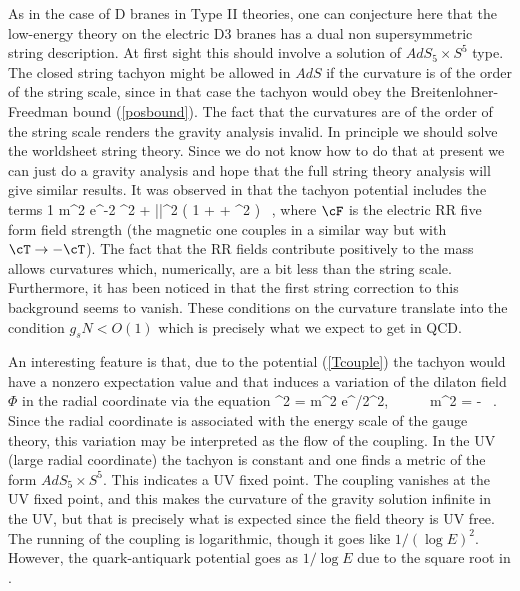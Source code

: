 As in the case of D branes in Type II theories, one
can conjecture here that the low-energy theory on the electric D3 branes 
has a dual non supersymmetric
string description. At first sight this should   involve a
solution of $AdS_5\times S^5$ type. 
The closed string tachyon might be allowed in $AdS$ if the curvature
is of the order of the string scale, since in that case the 
tachyon would obey the  Breitenlohner-Freedman bound (\ref{posbound}).
The fact that the curvatures are of the order of the string scale
renders the gravity analysis invalid. In principle we should
solve the worldsheet string theory. Since we  do not know how to 
do that at present
we can just do a gravity analysis and hope that the full string
theory analysis will give similar results. 
It was observed  in \cite{Klebanov:1998db} that the tachyon 
potential includes the terms
\beq
 {1 } m^2 e^{-2 \Phi} {\cT}^2 + 
|\cF|^2 \left( 1 + \cT  + { {\cT}^2 }  \right) \ ,
\label{Tcouple}
\eeq
where $\cF$ is the electric  RR five form field strength (the magnetic
one  
couples in a similar way but with $\cT \to - \cT$). 
The fact that the RR fields contribute positively to the mass
allows  curvatures which, numerically, 
are a bit less than the string scale. Furthermore, 
it has been noticed  in 
\cite{Klebanov:1998yy} that the first string correction to this
background seems to vanish. These conditions on the curvature 
translate into the condition  $g_sN < O(1)$ which is precisely what
we expect to get in QCD.
%


An interesting feature is that,
due to the potential (\ref{Tcouple}) the tachyon would have a nonzero
expectation value and that 
 induces a variation of the dilaton field $\Phi$
in the radial coordinate via the equation 
\cite{Minahan:1999tm,Klebanov:1998yy}
\beq
\nabla^2 \Phi = m^2 e^{\Phi/2}\cT^2,~~~~~~m^2 = 
- \ .
\eeq
Since the radial coordinate is associated with the energy scale of the
gauge theory, this variation may be interpreted as the flow of the
coupling.  In the UV (large radial coordinate) the tachyon is constant
and one finds a metric of the form $AdS_5 \times S^5$. This indicates
a UV fixed point. The coupling vanishes at the UV fixed point, and
this makes the curvature of the gravity solution infinite in the UV, but
that is precisely what is expected since the field theory is UV free.
The running of the coupling is logarithmic, though it  goes
like $ 1/(\log E)^2$. However,  the quark-antiquark potential goes as
 $1/\log E$ due to the square root in \energy .  

